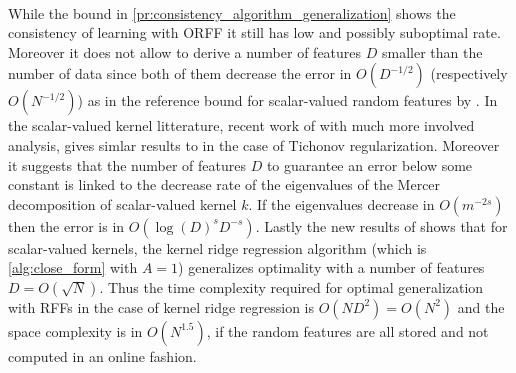 \paragraph{}
While the bound in \cref{pr:consistency_algorithm_generalization} shows the
consistency of learning with \acs{ORFF} it still has low and possibly
suboptimal rate. Moreover it does not allow to derive a number of features $D$
smaller than the number of data since both of them decrease the error in
$O(D^{-1/2})$ (respectively $O(N^{-1/2})$) as in the reference bound for
scalar-valued random features by \citet{rahimi2009weighted}. In the
scalar-valued kernel litterature, recent work of \citet{bach2015equivalence}
with much more involved analysis, gives simlar results to
\citet{rahimi2009weighted} in the case of Tichonov regularization.  Moreover it
suggests that the number of features $D$ to guarantee an error below some
constant is linked to the decrease rate of the eigenvalues of the Mercer
decomposition of scalar-valued kernel $k$. If the eigenvalues decrease in
$O(m^{-2s})$ then the error is in $O\left(\log(D)^s D^{-s}\right)$. Lastly the
new results of \citet{rudi2016generalization} shows that for scalar-valued
kernels, the kernel ridge regression algorithm (which is \cref{alg:close_form}
with $A = 1$) generalizes optimality with a number of features $D=O(\sqrt{N})$.
Thus the time complexity required for optimal generalization with \acsp{RFF} in
the case of kernel ridge regression is $O(ND^2)=O(N^{2})$ and the space
complexity is in $O(N^{1.5})$, if the random features are all stored and not
computed in an online fashion.

\chapterend
